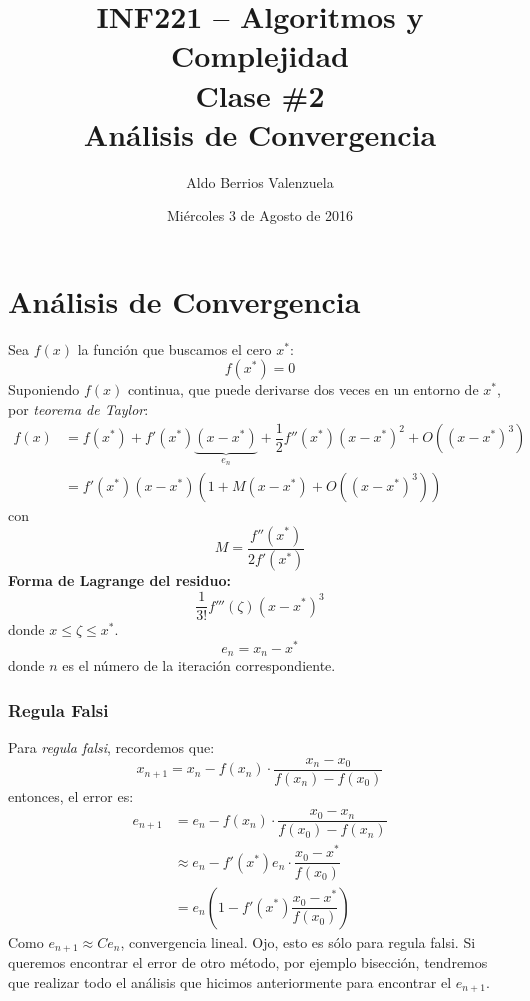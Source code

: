 \documentclass[english, spanish, fleqn, 10pt]{article}
\title{INF221 -- Algoritmos y Complejidad\\[.4\baselineskip]Clase \#2\\Análisis de Convergencia}
\author{Aldo Berrios Valenzuela}
\date{Miércoles 3 de Agosto de 2016}
\numberwithin{equation}{section}
\newcommand{\nparentesis}[1]{\left( #1 \right)}
\theoremstyle{definition}
\begin{document}
\maketitle
\section{Análisis de Convergencia}
Sea $f\nparentesis{x}$ la función que buscamos el cero $x^*$:
\begin{equation*}
f\nparentesis{x^*}=0
\end{equation*}
Suponiendo $f\nparentesis{x}$ continua, que puede derivarse dos veces en un entorno de $x^*$, por \textit{teorema de Taylor}:
\begin{align*}
f\nparentesis{x}&=f\nparentesis{x^*}+f'\nparentesis{x^*}\underbrace{\nparentesis{x-x^*}}_{e_n}+\dfrac{1}{2}f''\nparentesis{x^*}\nparentesis{x-x^*}^2+O\nparentesis{\nparentesis{x-x^*}^3}\\
&=f'\nparentesis{x^*}\nparentesis{x-x^*}\nparentesis{1+M\nparentesis{x-x^*}+O\nparentesis{\nparentesis{x-x^*}^3}}
\end{align*}
con
\begin{equation*}
M=\dfrac{f''\nparentesis{x^*}}{2f'\nparentesis{x^*}}
\end{equation*}
\textbf{Forma de Lagrange del residuo:}
\begin{equation}
\dfrac{1}{3!}f'''\nparentesis{\zeta}\nparentesis{x-x^*}^3
\end{equation}
donde $x\leq \zeta \leq x^*$.
\begin{equation}
e_n=x_n-x^*
\end{equation}
donde $n$ es el número de la iteración correspondiente.

\subsubsection{Regula Falsi}
Para \textit{regula falsi}, recordemos que:
\begin{equation}
x_{n+1}=x_n-f\nparentesis{x_n}\cdot \dfrac{x_n-x_0}{f\nparentesis{x_n}-f\nparentesis{x_0}}
\end{equation}
entonces, el error es:
\begin{align*}
e_{n+1}&=e_n-f\nparentesis{x_n}\cdot \dfrac{x_0-x_n}{f\nparentesis{x_0}-f\nparentesis{x_n}}\\
&\approx e_n-f'\nparentesis{x^*}e_n\cdot \dfrac{x_0-x^*}{f\nparentesis{x_0}}\\
&=e_n\nparentesis{1-f'\nparentesis{x^*}\dfrac{x_0-x^*}{f\nparentesis{x_0}}}
\end{align*}
Como $e_{n+1}\approx C e_n$, convergencia lineal. Ojo, esto es sólo para regula falsi. Si queremos encontrar el error de otro método, por ejemplo bisección, tendremos que realizar todo el análisis que hicimos anteriormente para encontrar el $e_{n+1}$.
\end{document}
